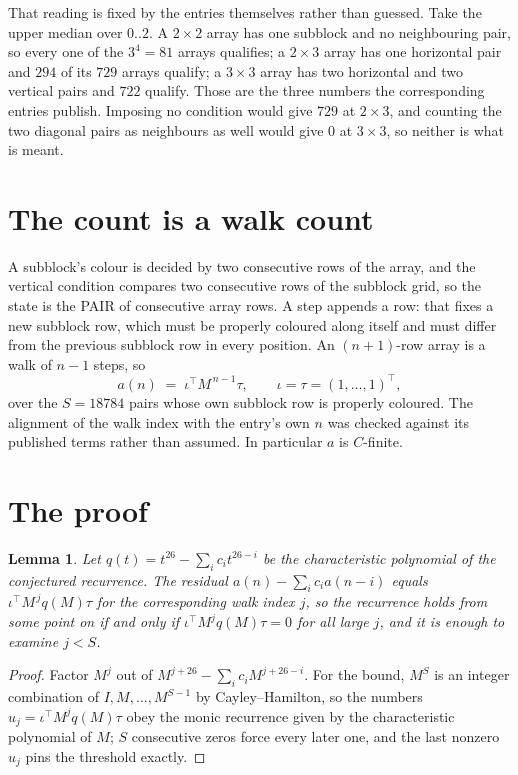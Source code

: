 \documentclass[11pt,a4paper]{article}
\theoremstyle{plain}
\newtheorem{lemma}[theorem]{Lemma}
\theoremstyle{definition}
\begin{document}
That reading is fixed by the entries themselves rather than guessed. Take the upper median
over $0..2$. A $2\times2$ array has one subblock and no neighbouring pair, so every one of the
$3^4=81$ arrays qualifies; a $2\times3$ array has one horizontal pair and $294$ of its $729$
arrays qualify; a $3\times3$ array has two horizontal and two vertical pairs and $722$
qualify. Those are the three numbers the corresponding entries publish. Imposing no condition
would give $729$ at $2\times3$, and counting the two diagonal pairs as neighbours as well
would give $0$ at $3\times3$, so neither is what is meant.

\section{The count is a walk count}

A subblock's colour is decided by two consecutive rows of the array, and
the vertical condition compares two consecutive rows of the subblock grid, so the state is the
PAIR of consecutive array rows. A step appends a row: that fixes a new subblock row, which
must be properly coloured along itself and must differ from the previous subblock row in every
position. An $(n+1)$-row array is a walk of $n-1$ steps, so
\[
a(n)\;=\;\iota^{\!\top}M^{\,n-1}\tau,\qquad\iota=\tau=(1,\dots,1)^{\!\top},
\]
over the $S=18784$ pairs whose own subblock row is properly coloured.
The alignment of the walk index with the entry's own $n$ was checked against its published
terms rather than assumed. In particular $a$ is $C$-finite.

\section{The proof}

\begin{lemma}\label{lem:crit}
Let $q(t)=t^{26}-\sum_i c_it^{26-i}$ be the characteristic polynomial of the
conjectured recurrence. The residual $a(n)-\sum_ic_ia(n-i)$ equals
$\iota^{\!\top}M^{\,j}q(M)\tau$ for the corresponding walk index $j$, so the recurrence
holds from some point on if and only if $\iota^{\!\top}M^{j}q(M)\tau=0$ for all large $j$,
and it is enough to examine $j<S$.
\end{lemma}

\begin{proof}
Factor $M^{j}$ out of $M^{j+26}-\sum_ic_iM^{j+26-i}$. For the bound, $M^{S}$
is an integer combination of $I,M,\dots,M^{S-1}$ by Cayley--Hamilton, so the numbers
$u_j=\iota^{\!\top}M^{j}q(M)\tau$ obey the monic recurrence given by the characteristic
polynomial of $M$; $S$ consecutive zeros force every later one, and the last nonzero $u_j$
pins the threshold exactly.
\end{proof}
\end{document}
